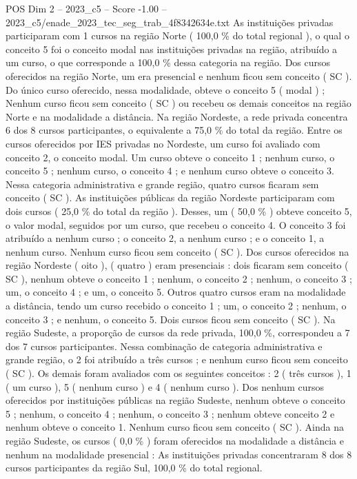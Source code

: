 \begin{textsample}{POS Dim 2 – 2023\_c5 – Score -1.00 – 2023\_c5/enade\_2023\_tec\_seg\_trab\_4f8342634e.txt}
As instituições privadas participaram com 1 cursos na região Norte ( 100,0 \% do total regional ), o qual o conceito 5 foi o conceito modal nas instituições privadas na região, atribuído a um curso, o que corresponde a 100,0 \% dessa categoria na região.
Dos cursos oferecidos na região Norte, um era presencial e nenhum ficou sem conceito ( SC ).
Do único curso oferecido, nessa modalidade, obteve o conceito 5 ( modal ) ; Nenhum curso ficou sem conceito ( SC ) ou recebeu os demais conceitos na região Norte e na modalidade a distância.
Na região Nordeste, a rede privada concentra 6 dos 8 cursos participantes, o equivalente a 75,0 \% do total da região.
Entre os cursos oferecidos por IES privadas no Nordeste, um curso foi avaliado com conceito 2, o conceito modal.
Um curso obteve o conceito 1 ; nenhum curso, o conceito 5 ; nenhum curso, o conceito 4 ; e nenhum curso obteve o conceito 3.
Nessa categoria administrativa e grande região, quatro cursos ficaram sem conceito ( SC ).
As instituições públicas da região Nordeste participaram com dois cursos ( 25,0 \% do total da região ).
Desses, um ( 50,0 \% ) obteve conceito 5, o valor modal, seguidos por um curso, que recebeu o conceito 4.
O conceito 3 foi atribuído a nenhum curso ; o conceito 2, a nenhum curso ; e o conceito 1, a nenhum curso.
Nenhum curso ficou sem conceito ( SC ).
Dos cursos oferecidos na região Nordeste ( oito ), ( quatro ) eram presenciais : dois ficaram sem conceito ( SC ), nenhum obteve o conceito 1 ; nenhum, o conceito 2 ; nenhum, o conceito 3 ; um, o conceito 4 ; e um, o conceito 5.
Outros quatro cursos eram na modalidade a distância, tendo um curso recebido o conceito 1 ; um, o conceito 2 ; nenhum, o conceito 3 ; e nenhum, o conceito 5.
Dois cursos ficou sem conceito ( SC ).
Na região Sudeste, a proporção de cursos da rede privada, 100,0 \%, correspondeu a 7 dos 7 cursos participantes.
Nessa combinação de categoria administrativa e grande região, o 2 foi atribuído a três cursos ; e nenhum curso ficou sem conceito ( SC ).
Os demais foram avaliados com os seguintes conceitos : 2 ( três cursos ), 1 ( um curso ), 5 ( nenhum curso ) e 4 ( nenhum curso ).
Dos nenhum cursos oferecidos por instituições públicas na região Sudeste, nenhum obteve o conceito 5 ; nenhum, o conceito 4 ; nenhum, o conceito 3 ; nenhum obteve conceito 2 e nenhum obteve o conceito 1.
Nenhum curso ficou sem conceito ( SC ).
Ainda na região Sudeste, os cursos ( 0,0 \% ) foram oferecidos na modalidade a distância e nenhum na modalidade presencial : As instituições privadas concentraram 8 dos 8 cursos participantes da região Sul, 100,0 \% do total regional.

\end{textsample}
